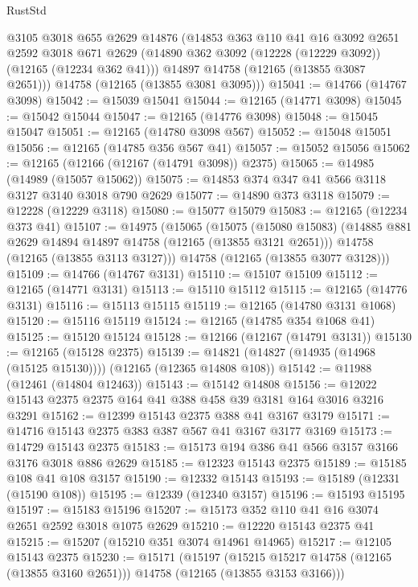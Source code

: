 \begin{lexlean}{RustStd}
\begin{coremodule}
      @3105
      @3018
      @655
      @2629
      @14876
      (@14853
        @363
        @110
        @41
        @16
        @3092
        @2651
        @2592
        @3018
        @671
        @2629
        (@14890 @362 @3092 (@12228 (@12229 @3092)) (@12165 (@12234 @362 @41)))
        @14897
        @14758
        (@12165 (@13855 @3087 @2651)))
      @14758
      (@12165 (@13855 @3081 @3095)))
@15041 := @14766 (@14767 @3098)
@15042 := @15039 @15041
@15044 := @12165 (@14771 @3098)
@15045 := @15042 @15044
@15047 := @12165 (@14776 @3098)
@15048 := @15045 @15047
@15051 := @12165 (@14780 @3098 @567)
@15052 := @15048 @15051
@15056 := @12165 (@14785 @356 @567 @41)
@15057 := @15052 @15056
@15062 := @12165 (@12166 (@12167 (@14791 @3098)) @2375)
@15065 := @14985 (@14989 (@15057 @15062))
@15075 := @14853 @374 @347 @41 @566 @3118 @3127 @3140 @3018 @790 @2629
@15077 := @14890 @373 @3118
@15079 := @12228 (@12229 @3118)
@15080 := @15077 @15079
@15083 := @12165 (@12234 @373 @41)
@15107 := @14975
    (@15065
      (@15075
        (@15080 @15083)
        (@14885 @881 @2629 @14894 @14897 @14758 (@12165 (@13855 @3121 @2651)))
        @14758
        (@12165 (@13855 @3113 @3127)))
      @14758
      (@12165 (@13855 @3077 @3128)))
@15109 := @14766 (@14767 @3131)
@15110 := @15107 @15109
@15112 := @12165 (@14771 @3131)
@15113 := @15110 @15112
@15115 := @12165 (@14776 @3131)
@15116 := @15113 @15115
@15119 := @12165 (@14780 @3131 @1068)
@15120 := @15116 @15119
@15124 := @12165 (@14785 @354 @1068 @41)
@15125 := @15120 @15124
@15128 := @12166 (@12167 (@14791 @3131))
@15130 := @12165 (@15128 @2375)
@15139 := @14821 (@14827 (@14935 (@14968 (@15125 @15130)))) (@12165 (@12365 @14808 @108))
@15142 := @11988 (@12461 (@14804 @12463))
@15143 := @15142 @14808
@15156 := @12022 @15143 @2375 @2375 @164 @41 @388 @458 @39 @3181 @164 @3016 @3216 @3291
@15162 := @12399 @15143 @2375 @388 @41 @3167 @3179
@15171 := @14716 @15143 @2375 @383 @387 @567 @41 @3167 @3177 @3169
@15173 := @14729 @15143 @2375
@15183 := @15173 @194 @386 @41 @566 @3157 @3166 @3176 @3018 @886 @2629
@15185 := @12323 @15143 @2375
@15189 := @15185 @108 @41 @108 @3157
@15190 := @12332 @15143
@15193 := @15189 (@12331 (@15190 @108))
@15195 := @12339 (@12340 @3157)
@15196 := @15193 @15195
@15197 := @15183 @15196
@15207 := @15173 @352 @110 @41 @16 @3074 @2651 @2592 @3018 @1075 @2629
@15210 := @12220 @15143 @2375 @41
@15215 := @15207 (@15210 @351 @3074 @14961 @14965)
@15217 := @12105 @15143 @2375
@15230 := @15171
    (@15197
      (@15215 @15217 @14758 (@12165 (@13855 @3160 @2651)))
      @14758
      (@12165 (@13855 @3153 @3166)))

\end{coremodule}
\end{lexlean}
